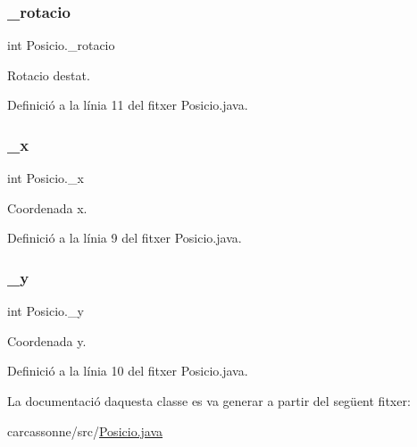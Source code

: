 \subsubsection{\texorpdfstring{\+\_\+rotacio}{\_rotacio}}
{\footnotesize\ttfamily int Posicio.\+\_\+rotacio\hspace{0.3cm}{\ttfamily [private]}}



Rotacio d\textquotesingle{}estat. 



Definició a la línia 11 del fitxer Posicio.\+java.

\mbox{\label{class_posicio_ad4630c3ac54fee2bb3f16e8199be8dda}} 
\subsubsection{\texorpdfstring{\+\_\+x}{\_x}}
{\footnotesize\ttfamily int Posicio.\+\_\+x\hspace{0.3cm}{\ttfamily [private]}}



Coordenada x. 



Definició a la línia 9 del fitxer Posicio.\+java.

\mbox{\label{class_posicio_a95c50cf40b0f7c5570a516d058122543}} 
\subsubsection{\texorpdfstring{\+\_\+y}{\_y}}
{\footnotesize\ttfamily int Posicio.\+\_\+y\hspace{0.3cm}{\ttfamily [private]}}



Coordenada y. 



Definició a la línia 10 del fitxer Posicio.\+java.



La documentació d\textquotesingle{}aquesta classe es va generar a partir del següent fitxer\+:\begin{DoxyCompactItemize}
\item 
carcassonne/src/\mbox{\hyperlink{_posicio_8java}{Posicio.\+java}}\end{DoxyCompactItemize}
